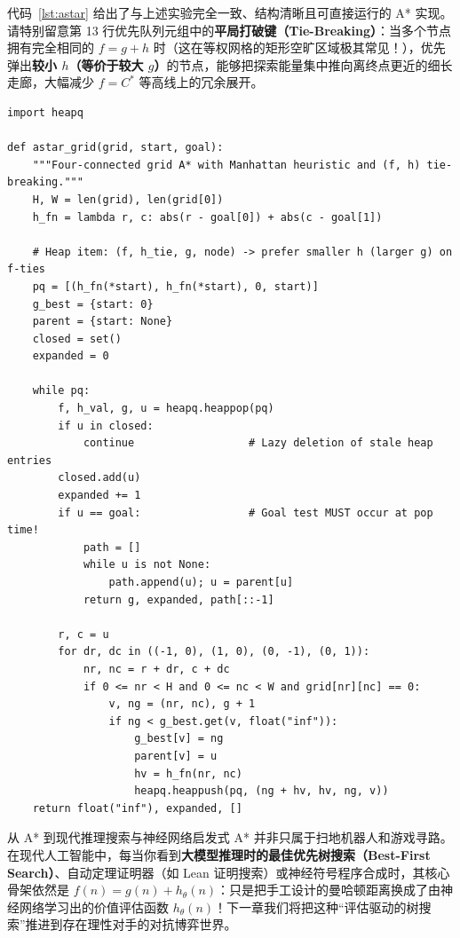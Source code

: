 代码~\ref{lst:astar} 给出了与上述实验完全一致、结构清晰且可直接运行的 A* 实现。请特别留意第 13 行优先队列元组中的\textbf{平局打破键（Tie-Breaking）}：当多个节点拥有完全相同的 $f = g + h$ 时（这在等权网格的矩形空旷区域极其常见！），优先弹出\textbf{较小 $h$（等价于较大 $g$）}的节点，能够把探索能量集中推向离终点更近的细长走廊，大幅减少 $f=C^*$ 等高线上的冗余展开。

\begin{lstlisting}[caption={带一致平局打破键的图搜索 A* Python 实现（对应 \texttt{code/vol3\_experiments.py}）},label={lst:astar}]
import heapq

def astar_grid(grid, start, goal):
    """Four-connected grid A* with Manhattan heuristic and (f, h) tie-breaking."""
    H, W = len(grid), len(grid[0])
    h_fn = lambda r, c: abs(r - goal[0]) + abs(c - goal[1])

    # Heap item: (f, h_tie, g, node) -> prefer smaller h (larger g) on f-ties
    pq = [(h_fn(*start), h_fn(*start), 0, start)]
    g_best = {start: 0}
    parent = {start: None}
    closed = set()
    expanded = 0

    while pq:
        f, h_val, g, u = heapq.heappop(pq)
        if u in closed:
            continue                  # Lazy deletion of stale heap entries
        closed.add(u)
        expanded += 1
        if u == goal:                 # Goal test MUST occur at pop time!
            path = []
            while u is not None:
                path.append(u); u = parent[u]
            return g, expanded, path[::-1]

        r, c = u
        for dr, dc in ((-1, 0), (1, 0), (0, -1), (0, 1)):
            nr, nc = r + dr, c + dc
            if 0 <= nr < H and 0 <= nc < W and grid[nr][nc] == 0:
                v, ng = (nr, nc), g + 1
                if ng < g_best.get(v, float("inf")):
                    g_best[v] = ng
                    parent[v] = u
                    hv = h_fn(nr, nc)
                    heapq.heappush(pq, (ng + hv, hv, ng, v))
    return float("inf"), expanded, []
\end{lstlisting}

\begin{insightBox}{从 A* 到现代推理搜索与神经网络启发式}
A* 并非只属于扫地机器人和游戏寻路。在现代人工智能中，每当你看到\textbf{大模型推理时的最佳优先树搜索（Best-First Search）}、自动定理证明器（如 Lean 证明搜索）或神经符号程序合成时，其核心骨架依然是 $f(n) = g(n) + h_\theta(n)$：只是把手工设计的曼哈顿距离换成了由神经网络学习出的价值评估函数 $h_\theta(n)$！下一章我们将把这种“评估驱动的树搜索”推进到存在理性对手的对抗博弈世界。
\end{insightBox}

